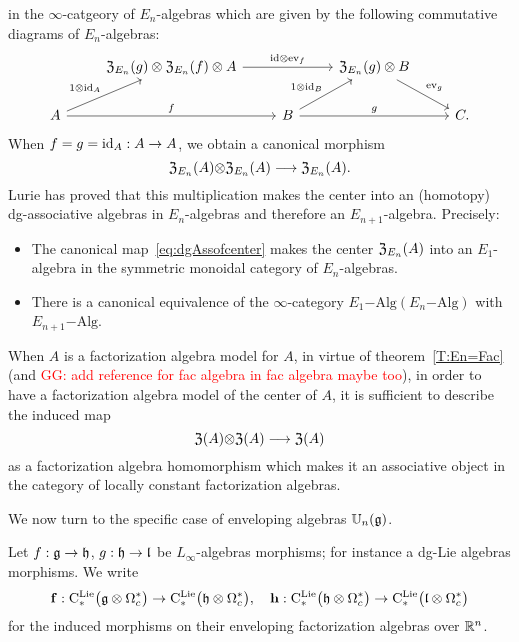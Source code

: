\documentclass[11pt]{amsart}
\numberwithin{equation}{section}
\def\greg{\textcolor{red}{GG: }\textcolor{red}}
\begin{document}
in the $\infty$-catgeory of $E_n$-algebras which are given by the  
following commutative diagrams of $E_n$-algebras:
\[\begin{tikzcd}
&   {\frak Z}_{E_n}(g) \otimes  {\frak Z}_{E_n}(f) \otimes A \arrow[rr, "\id\otimes \ev_f"] &&  {\frak Z}_{E_n}(g) \otimes  B \arrow[dr, "\ev_g"]\\
A \arrow[ur, "1\otimes \id_A"] \arrow[rr, "f"] && B \arrow[rr, "g"] \arrow[ur, "1\otimes \id_B"] && C. 
\end{tikzcd}\]
 When $f=g={\rm id}_A:A\to A$, we obtain a canonical morphism \begin{equation} \label{eq:dgAssofcenter}
 {\frak Z}_{E_n}(A){\otimes} {\frak Z}_{E_n}(A) \longrightarrow {\frak Z}_{E_n}(A).\end{equation}
 Lurie has proved that this multiplication makes the center into an (homotopy) dg-associative algebras in $E_n$-algebras 
 and therefore an $E_{n+1}$-algebra. Precisely: 
\begin{prp} \label{P:PtyCenter}
\begin{itemize}
 \item The canonical map~\eqref{eq:dgAssofcenter} makes the center ${\frak Z}_{E_n}(A)$ into an $E_1$-algebra in the symmetric monoidal category of 
 $E_n$-algebras.
 \item There is a canonical equivalence of the $\infty$-category $E_1\mathrm{-Alg}(E_n\mathrm{-Alg})$ with $E_{n+1}\mathrm{-Alg}$.
\end{itemize}
\end{prp}
When $A$ is a factorization algebra model for $A$, in virtue of theorem~\ref{T:En=Fac} 
(and \greg{add reference for fac algebra in fac algebra maybe too}), in order to have a factorization algebra 
model of the center of $A$, it is sufficient to describe the induced map 
\[{\frak Z}(A){\otimes} {\frak Z}(A) \longrightarrow {\frak Z}(A)\]
as a factorization algebra homomorphism which makes it an associative object in the category of locally constant factorization algebras.



We now turn to the specific case   of enveloping algebras $\mathbb U_n(\mathfrak g)$.

Let $f: \mathfrak g \to \mathfrak h$, $g: \mathfrak h \to \mathfrak l$ be  $L_\infty$-algebras morphisms; for instance a dg-Lie algebras morphisms. We write 
\[ \mathbf{f}:{\rm C}^{\rm Lie}_*\big(\mathfrak g \otimes \Omega^*_c\big) \to  {\rm C}^{\rm Lie}_*\big(\mathfrak h \otimes \Omega^*_c\big), \quad 
\mathbf{h}:{\rm C}^{\rm Lie}_*\big(\mathfrak h \otimes \Omega^*_c\big) \to  {\rm C}^{\rm Lie}_*\big(\mathfrak l \otimes \Omega^*_c\big)\]
for the induced morphisms on their enveloping factorization algebras over $\mathbb R^n$.
\end{document}
